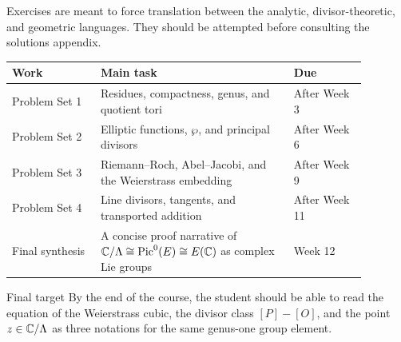 Exercises are meant to force translation between the analytic, divisor-theoretic,
and geometric languages.  They should be attempted before consulting the
solutions appendix.

\begin{center}
\small
\renewcommand{\arraystretch}{1.2}
\begin{tabular}{@{}L{0.22\linewidth}L{0.48\linewidth}L{0.18\linewidth}@{}}
\textbf{Work} & \textbf{Main task} & \textbf{Due}\\
\hline
Problem Set 1 &
Residues, compactness, genus, and quotient tori &
After Week 3\\
Problem Set 2 &
Elliptic functions, \(\wp\), and principal divisors &
After Week 6\\
Problem Set 3 &
Riemann--Roch, Abel--Jacobi, and the Weierstrass embedding &
After Week 9\\
Problem Set 4 &
Line divisors, tangents, and transported addition &
After Week 11\\
Final synthesis &
A concise proof narrative of
\(\mathbb{C}/\Lambda\cong\operatorname{Pic}^0(E)\cong E(\mathbb{C})\) as complex Lie groups &
Week 12
\end{tabular}
\end{center}

\begin{keyidea}{Final target}
By the end of the course, the student should be able to read the equation of
the Weierstrass cubic, the divisor class \([P]-[O]\), and the point
\(z\in\mathbb{C}/\Lambda\) as three notations for the same genus-one group element.
\end{keyidea}
